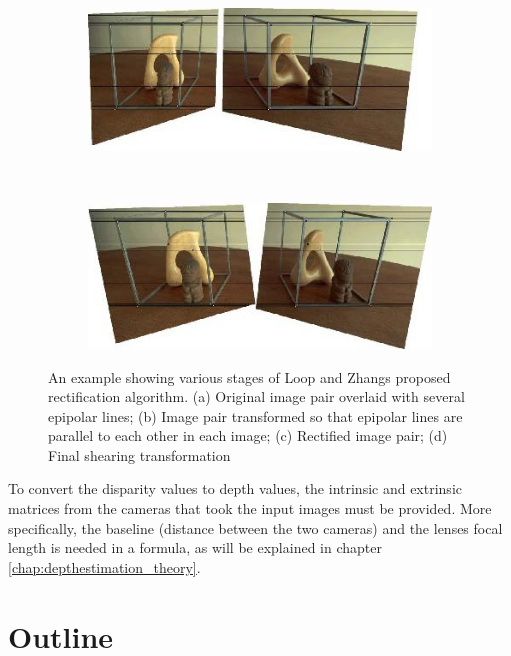 \begin{figure}
  \begin{subfigure}[b]{0.48\textwidth}
    \centering
    \includegraphics[width=\textwidth]{images/rectification-example-3.png}
    \caption{}
  \end{subfigure}
  ~
  \begin{subfigure}[b]{0.48\textwidth}
    \centering
    \includegraphics[width=\textwidth]{images/rectification-example-4.png}
    \caption{}
  \end{subfigure}

  \caption{An example showing various stages of Loop and
    Zhangs\cite{loop-zhang} proposed rectification algorithm. (a)
    Original image pair overlaid with several epipolar lines; (b)
    Image pair transformed so that epipolar lines are parallel to each
    other in each image; (c) Rectified image pair; (d) Final shearing
    transformation}

\end{figure}

To convert the disparity values to depth values, the intrinsic and
extrinsic matrices from the cameras that took the input images must be
provided. More specifically, the baseline (distance between the two
cameras) and the lenses focal length is needed in a formula, as will
be explained in chapter \ref{chap:depthestimation_theory}.

\section{Outline}

